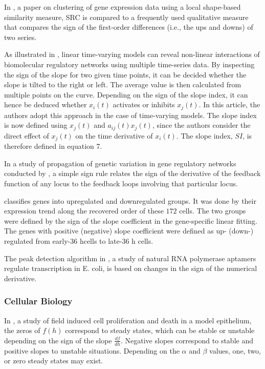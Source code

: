\documentclass[11pt]{book}
\begin{document}
In \cite{balasubramaniyan2005clustering}, a paper on clustering of gene expression data using a local
shape-based similarity measure, SRC is compared to a frequently
used qualitative measure that compares the sign of the first-order
differences (i.e., the ups and downs) of two series.

As illustrated in \cite{kim2008linear}, linear time-varying models can reveal non-linear interactions of
biomolecular regulatory networks using multiple time-series data. By inspecting the sign of
the slope for two given time points, it can be decided whether the
slope is tilted to the right or left. The average value is then calculated
from multiple points on the curve. Depending on the sign of the slope
index, it can hence be deduced whether $x_{i}\left(t\right)$ activates
or inhibits $x_{j}\left(t\right)$. In this article, the authors adopt
this approach in the case of time-varying models. The slope index
is now defined using $x_{j}\left(t\right)$ and $a_{ij}\left(t\right)x_{j}\left(t\right)$,
since the authors consider the direct effect of $x_{j}\left(t\right)$
on the time derivative of $x_{i}\left(t\right)$. The slope index,
$SI$, is therefore defined in equation 7.

In a study of propagation of genetic variation in
gene regulatory networks conducted by \cite{plahte2013propagation}, a simple sign rule relates the sign
of the derivative of the feedback function of any locus to the feedback
loops involving that particular locus.

\cite{chu2016single} classifies genes into upregulated
and downregulated groups. It was done by their expression trend along
the recovered order of these $172$ cells. The two groups were defined
by the sign of the slope coefficient in the gene-specific linear fitting.
The genes with positive (negative) slope coefficient were defined
as up- (down-) regulated from early-$36$ hcells to late-$36$ h cells.

The peak detection algorithm in \cite{sedlyarova2017natural}, a study of natural RNA polymerase aptamers regulate transcription in E.
coli, is based
on changes in the sign of the numerical derivative.


\subsubsection{Cellular Biology}

In \cite{sarkar2019field}, a study of field induced cell proliferation and
death in a model epithelium, the zeros of $f\left(h\right)$ correspond
to steady states, which can be stable or unstable depending on the
sign of the slope $\frac{df}{dh}$. Negative slopes correspond to
stable and positive slopes to unstable situations. Depending on the
$\alpha$ and $\beta$ values, one, two, or zero steady states may
exist.
\end{document}
